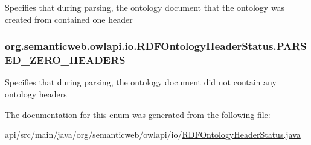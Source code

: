 Specifies that during parsing, the ontology document that the ontology was created from contained one header \hypertarget{enumorg_1_1semanticweb_1_1owlapi_1_1io_1_1_r_d_f_ontology_header_status_a8295e083a8caf6c02634a5213ab1ae42}{
\subsubsection[{P\-A\-R\-S\-E\-D\-\_\-\-Z\-E\-R\-O\-\_\-\-H\-E\-A\-D\-E\-R\-S}]{\setlength{\rightskip}{0pt plus 5cm}org.\-semanticweb.\-owlapi.\-io.\-R\-D\-F\-Ontology\-Header\-Status.\-P\-A\-R\-S\-E\-D\-\_\-\-Z\-E\-R\-O\-\_\-\-H\-E\-A\-D\-E\-R\-S}}\label{enumorg_1_1semanticweb_1_1owlapi_1_1io_1_1_r_d_f_ontology_header_status_a8295e083a8caf6c02634a5213ab1ae42}
Specifies that during parsing, the ontology document did not contain any ontology headers 

The documentation for this enum was generated from the following file\-:\begin{DoxyCompactItemize}
\item 
api/src/main/java/org/semanticweb/owlapi/io/\hyperlink{_r_d_f_ontology_header_status_8java}{R\-D\-F\-Ontology\-Header\-Status.\-java}\end{DoxyCompactItemize}

